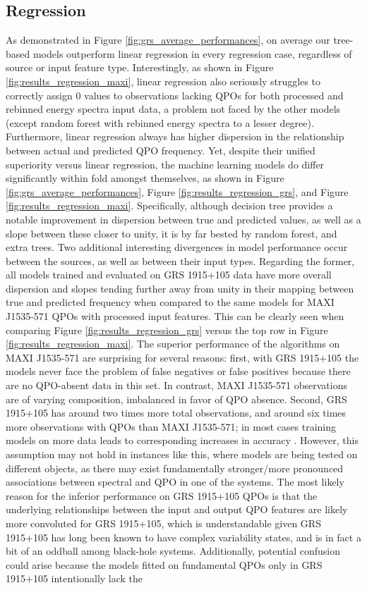 \documentclass[fleqn,usenatbib,twocolumn]{mnras}%
\begin{document}
\subsection{Regression}

As demonstrated in Figure \ref{fig:grs_average_performances}, on average our tree-based models outperform linear regression in every regression case, regardless of source or input feature type. Interestingly, as shown in Figure \ref{fig:results_regression_maxi}, linear regression also seriously struggles to correctly assign $0$ values to observations lacking QPOs for both processed and rebinned energy spectra input data, a problem not faced by the other models (except random forest with rebinned energy spectra to a lesser degree). Furthermore, linear regression always has higher dispersion in the relationship between actual and predicted QPO frequency. Yet, despite their unified superiority versus linear regression, the machine learning models do differ significantly within fold amongst themselves, as shown in Figure \ref{fig:grs_average_performances}, Figure \ref{fig:results_regression_grs}, and Figure \ref{fig:results_regression_maxi}. Specifically, although decision tree provides a notable improvement in dispersion between true and predicted values, as well as a slope between these closer to unity, it is by far bested by random forest, and extra trees. Two additional interesting divergences in model performance occur between the sources, as well as between their input types. Regarding the former, all models trained and evaluated on GRS 1915+105 data have more overall dispersion and slopes tending further away from unity in their mapping between true and predicted frequency when compared to the same models for MAXI J1535-571 QPOs with processed input features. This can be clearly seen when comparing Figure \ref{fig:results_regression_grs} versus the top row in Figure \ref{fig:results_regression_maxi}. The superior performance of the algorithms on MAXI J1535-571 are surprising for several reasons: first, with GRS 1915+105 the models never face the problem of false negatives or false positives because there are no QPO-absent data in this set. In contrast, MAXI J1535-571 observations are of varying composition, imbalanced in favor of QPO absence. Second, GRS 1915+105 has around two times more total observations, and around six times more observations with QPOs than MAXI J1535-571; in most cases training models on more data leads to corresponding increases in accuracy \citep{kalinin2020handbook,brefeld2020machine}. However, this assumption may not hold in instances like this, where models are being tested on different objects, as there may exist fundamentally stronger/more pronounced associations between spectral and QPO in one of the systems. The most likely reason for the inferior performance on GRS 1915+105 QPOs is that the underlying relationships between the input and output QPO features are likely more convoluted for GRS 1915+105, which is understandable given GRS 1915+105 has long been known to have complex variability states, and is in fact a bit of an oddball among black-hole systems. Additionally, potential confusion could arise because the models fitted on fundamental QPOs only in GRS 1915+105 intentionally lack the 
\end{document}
